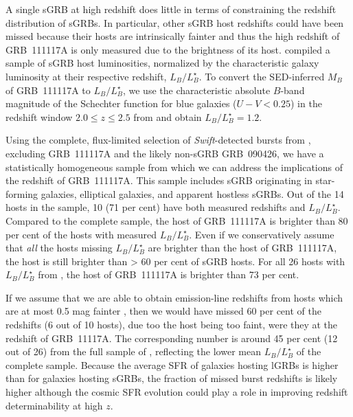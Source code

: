 \documentclass{aa}    %
\begin{document}
A single sGRB at high redshift does little in terms of constraining the redshift
distribution of sGRBs. In particular, other sGRB host redshifts could have been
missed because their hosts are intrinsically fainter and thus the high redshift
of GRB~111117A is only measured due to the brightness of its host.
\citet{Berger2014} compiled a sample of sGRB host luminosities, normalized by
the characteristic galaxy luminosity at their respective redshift,
$L_B/L^{\star}_{B}$. To convert the SED-inferred $M_B$ of GRB~111117A to
$L_B/L^{\star}_{B}$, we use the characteristic absolute $B$-band magnitude of
the Schechter function for blue galaxies ($U - V < 0.25$) in the redshift window
$2.0 \leq z \leq 2.5$ from \citet{Marchesini2007} and obtain $L_B/L^{\star}_{B}
= 1.2$.

Using the complete, flux-limited selection of \textit{Swift}-detected bursts
from \citet{DAvanzo2014a}, excluding GRB~111117A and the likely non-sGRB
GRB~090426, we have a statistically homogeneous sample from which we can address
the implications of the redshift of GRB~111117A. This sample includes sGRB
originating in star-forming galaxies, elliptical galaxies, and apparent hostless
sGRBs. Out of the 14 hosts in the sample, 10 (71 per cent) have both measured
redshifts and $L_B/L^{\star}_{B}$. Compared to the complete sample, the host of
GRB~111117A  is brighter than 80 per cent of the hosts with measured
$L_B/L^{\star}_{B}$. Even if we conservatively assume that \textit{all} the
hosts missing $L_B/L^{\star}_{B}$ are brighter than the host of GRB~111117A, the
host is still brighter than > 60 per cent of sGRB hosts. For all 26 hosts with
$L_B/L^{\star}_{B}$ from \citet{Berger2014}, the host of GRB~111117A is brighter
than 73 per cent.

If we assume that we are able to obtain emission-line redshifts from hosts which
are at most 0.5 mag fainter \citep[$R < 24.5$~mag;][]{Kruhler2012}, then we
would have missed 60 per cent of the redshifts (6 out of 10 hosts), due too the
host being too faint, were they at the redshift of GRB~11117A. The corresponding
number is around 45 per cent (12 out of 26) from the full sample of
\citet{Berger2014}, reflecting the lower mean $L_B/L^{\star}_{B}$ of the
complete sample. Because the average SFR of galaxies hosting lGRBs is higher
than for galaxies hosting sGRBs, the fraction of missed burst redshifts is
likely higher although the cosmic SFR evolution could play a role in improving
redshift determinability at high $z$.
\end{document}
